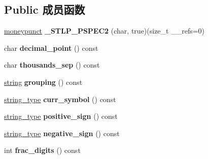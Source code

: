 \subsection*{Public 成员函数}
\begin{DoxyCompactItemize}
\item 
\mbox{\label{classmoneypunct_3_01char_00_01true_01_4_a251a2290194c5240f0219bb7460c46ff}} 
\hyperlink{classmoneypunct}{moneypunct} {\bfseries \+\_\+\+S\+T\+L\+P\+\_\+\+P\+S\+P\+E\+C2} (char, true)(size\+\_\+t \+\_\+\+\_\+refs=0)
\item 
\mbox{\label{classmoneypunct_3_01char_00_01true_01_4_a94b9b389f7503cbcfab00217396b883d}} 
char {\bfseries decimal\+\_\+point} () const
\item 
\mbox{\label{classmoneypunct_3_01char_00_01true_01_4_a3309701cb430ea7afec9a3e6a1d8ef51}} 
char {\bfseries thousands\+\_\+sep} () const
\item 
\mbox{\label{classmoneypunct_3_01char_00_01true_01_4_a6be0fb430d8e367074ad7dce1502a380}} 
\hyperlink{structstring}{string} {\bfseries grouping} () const
\item 
\mbox{\label{classmoneypunct_3_01char_00_01true_01_4_a174f76cc3bf8ed49c9c42e9576d39e84}} 
\hyperlink{structstring}{string\+\_\+type} {\bfseries curr\+\_\+symbol} () const
\item 
\mbox{\label{classmoneypunct_3_01char_00_01true_01_4_a0ab47fc285995dec5f5f25eb05419cc5}} 
\hyperlink{structstring}{string\+\_\+type} {\bfseries positive\+\_\+sign} () const
\item 
\mbox{\label{classmoneypunct_3_01char_00_01true_01_4_a52ca4703ba2ef8a4e54254e336fdba6e}} 
\hyperlink{structstring}{string\+\_\+type} {\bfseries negative\+\_\+sign} () const
\item 
\mbox{\label{classmoneypunct_3_01char_00_01true_01_4_a3cc587bf7b7421e6d897d9be5449ea66}} 
int {\bfseries frac\+\_\+digits} () const

\end{DoxyCompactItemize}
